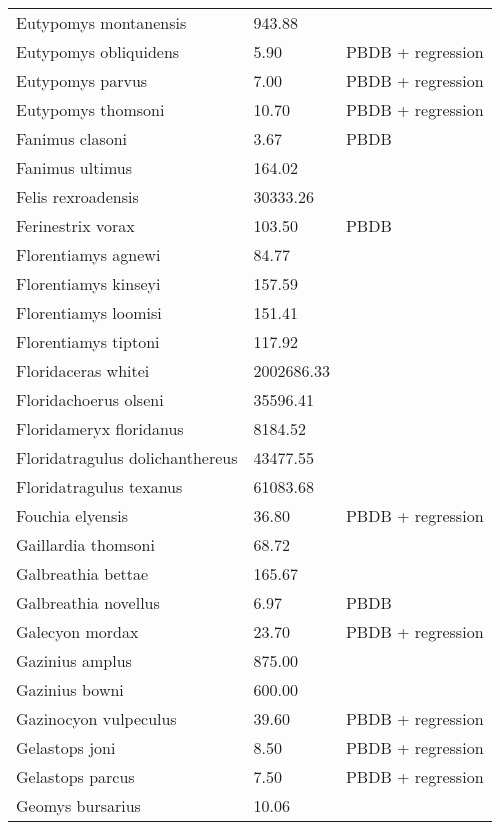 \begin{longtable}{p{} p{} p{}}
    Eutypomys montanensis & 943.88 & \cite{Tomiya2013} \\ 
    Eutypomys obliquidens & 5.90 & PBDB + regression \\ 
    Eutypomys parvus & 7.00 & PBDB + regression \\ 
    Eutypomys thomsoni & 10.70 & PBDB + regression \\ 
    Fanimus clasoni & 3.67 & PBDB \\ 
    Fanimus ultimus & 164.02 & \cite{Tomiya2013} \\ 
    Felis rexroadensis & 30333.26 & \cite{Tomiya2013} \\ 
    Ferinestrix vorax & 103.50 & PBDB \\ 
    Florentiamys agnewi & 84.77 & \cite{Tomiya2013} \\ 
    Florentiamys kinseyi & 157.59 & \cite{Tomiya2013} \\ 
    Florentiamys loomisi & 151.41 & \cite{Tomiya2013} \\ 
    Florentiamys tiptoni & 117.92 & \cite{Tomiya2013} \\ 
    Floridaceras whitei & 2002686.33 & \cite{Tomiya2013} \\ 
    Floridachoerus olseni & 35596.41 & \cite{Tomiya2013} \\ 
    Floridameryx floridanus & 8184.52 & \cite{Tomiya2013} \\ 
    Floridatragulus dolichanthereus & 43477.55 & \cite{Tomiya2013} \\ 
    Floridatragulus texanus & 61083.68 & \cite{Tomiya2013} \\ 
    Fouchia elyensis & 36.80 & PBDB + regression \\ 
    Gaillardia thomsoni & 68.72 & \cite{Tomiya2013} \\ 
    Galbreathia bettae & 165.67 & \cite{Tomiya2013} \\ 
    Galbreathia novellus & 6.97 & PBDB \\ 
    Galecyon mordax & 23.70 & PBDB + regression \\ 
    Gazinius amplus & 875.00 & \cite{Soligo2006} \\ 
    Gazinius bowni & 600.00 & \cite{Soligo2006} \\ 
    Gazinocyon vulpeculus & 39.60 & PBDB + regression \\ 
    Gelastops joni & 8.50 & PBDB + regression \\ 
    Gelastops parcus & 7.50 & PBDB + regression \\ 
    Geomys bursarius & 10.06 & \cite{Smith2004} \\ 

\end{longtable}
